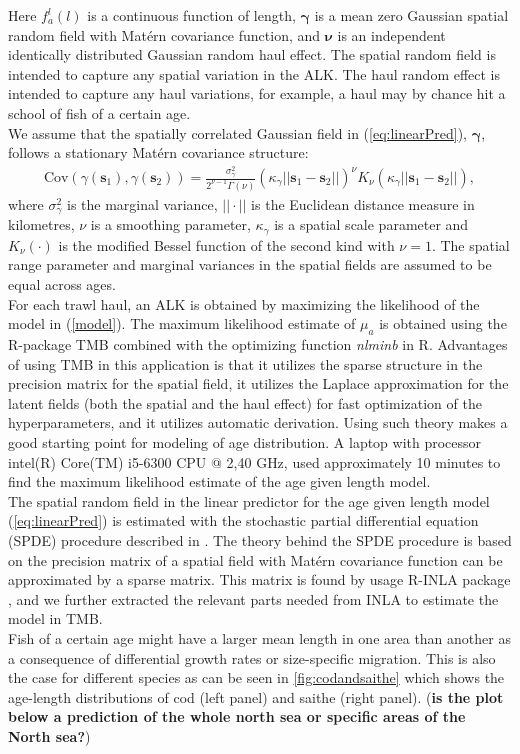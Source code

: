 \documentclass[a4paper 12pt]{article}
\numberwithin{equation}{section}
\begin{document}
Here $ f_a^l(l)$ is a continuous function of length, $\pmb{\gamma}$ is a mean zero Gaussian spatial random field with Mat\'{e}rn covariance function, and $\pmb{\nu}$ is an independent identically distributed Gaussian random haul effect. The spatial random field is intended to capture any spatial variation in the ALK. The haul random effect is intended to capture any haul variations, for example, a haul may by chance hit a school of fish of a certain age.\\  
\indent We assume that the spatially correlated Gaussian field in (\ref{eq:linearPred}), $\pmb{\gamma}$, follows a stationary Mat\'{e}rn covariance structure:
\begin{align}\label{eq:matern}
 \text{Cov}(\gamma(\mathbf{s}_1),\gamma(\mathbf{s}_2)) = \frac{\sigma^2_{\gamma}}{2^{\nu-1}\Gamma(\nu)}(\kappa_{\gamma}||\mathbf{s}_1 -\mathbf{s}_2||)^{\nu}K_{\nu}(\kappa_{\gamma}||\mathbf{s}_1-\mathbf{s}_2||),
\end{align}
where $\sigma^2_{\gamma}$ is the marginal variance, $||\cdot||$ is the Euclidean distance measure in kilometres, $\nu$ is a smoothing parameter, $\kappa_{\gamma}$ is a spatial scale parameter and $K_{\nu}(\cdot)$ is the modified Bessel function of the second kind with $\nu = 1$. The spatial range parameter and marginal variances in the spatial fields are assumed to be equal across ages.\\
\indent For each trawl haul, an ALK is obtained by maximizing the likelihood of the model in (\ref{model}). The maximum likelihood estimate of ${\mu}_{a}$  is obtained using the R-package TMB \citep{kristensen2015tmb} combined with the optimizing function \textit{nlminb} in R. Advantages of using TMB in this application is that it utilizes the sparse structure in the precision matrix for the spatial field, it utilizes the Laplace approximation for the latent fields (both the spatial and the haul effect) for fast optimization of the hyperparameters, and it utilizes automatic derivation.  Using such theory makes a good starting point for modeling of age distribution.  A laptop with  processor intel(R) Core(TM) i5-6300 CPU @ 2,40 GHz, used approximately 10 minutes to find the maximum likelihood estimate of the age given length model. \\
\indent The spatial random field in the linear predictor for the age given length model (\ref{eq:linearPred}) is estimated with the stochastic partial differential equation (SPDE) procedure described in \citep{lindgren2011explicit}. The theory behind the SPDE procedure is based on the precision matrix of a spatial field with Mat\'{e}rn  covariance function can be approximated by a sparse matrix. This matrix is found by usage R-INLA package \citep{rue2009approximate}, and we further extracted the relevant parts needed from INLA to estimate the model in TMB.\\
\indent Fish of a certain age might have a larger mean length in one area than another as a consequence of differential growth rates or size-specific migration. This is also the case for different species as can be seen in  \ref{fig:codandsaithe} which shows the age-length distributions of cod (left panel) and saithe (right panel). ({\bf is the plot below a prediction of the whole north sea or specific areas of the North sea?})
\end{document}
